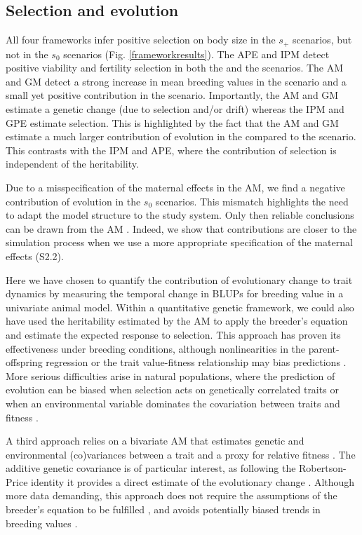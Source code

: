\subsection*{Selection and evolution}
All four frameworks infer positive selection on body size in the $s_+$ scenarios, but not in the $s_0$ scenarios (Fig. \ref{frameworkresults}). The APE and IPM detect positive viability and fertility selection in both the \SH and the \Sh scenarios. The AM and GM detect a strong increase in mean breeding values in the \SH scenario and a small yet positive contribution in the \Sh scenario. Importantly, the AM and GM estimate a genetic change (due to selection and/or drift) whereas the IPM and GPE estimate selection. This is highlighted by the fact that the AM and GM estimate a much larger contribution of evolution in the \SH compared to the \Sh scenario. This contrasts with the IPM and APE, where the contribution of selection is independent of the heritability. 

Due to a misspecification of the maternal effects in the AM, we find a negative contribution of evolution in the $s_0$ scenarios. This mismatch highlights the need to adapt the model structure to the study system. Only then reliable conclusions can be drawn from the AM \parencite[see also][]{Hadfield2011}. Indeed, we show that contributions are closer to the simulation process when we use a more appropriate specification of the maternal effects (S2.2). 

Here we have chosen to quantify the contribution of evolutionary change to trait dynamics by measuring the temporal change in BLUPs for breeding value in a univariate animal model. Within a quantitative genetic framework, we could also have used the heritability estimated by the AM to apply the breeder's equation and estimate the expected response to selection. This approach has proven its effectiveness under breeding conditions, although nonlinearities in the parent-offspring regression or the trait value-fitness relationship may bias predictions \parencite{Heywood2005}. More serious difficulties arise in natural populations, where the prediction of evolution can be biased when selection acts on genetically correlated traits or when an environmental variable dominates the covariation between traits and fitness \parencite{Rausher1992,Morrissey2010}.

A third approach relies on a bivariate AM that estimates genetic and environmental (co)variances between a trait and a proxy for relative fitness \parencite{Lande1979,Lynch2014}. The additive genetic covariance is of particular interest, as following the Robertson-Price identity it provides a direct estimate of the evolutionary change \parencite{Robertson1966,Price1970,Lynch2014}. Although more data demanding, this approach does not require the assumptions of the breeder's equation to be fulfilled \parencite{Morrissey2012sts}, and avoids potentially biased trends in breeding values \parencite{Postma2006}.

